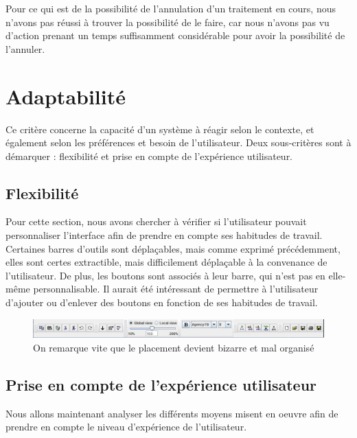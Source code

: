 \documentclass[12pt, a4paper]{article}
\begin{document}
Pour ce qui est de la possibilité de l'annulation d'un traitement en cours, nous n'avons pas réussi à trouver la possibilité de le faire, car nous n'avons pas vu d'action prenant un temps suffisamment considérable pour avoir la possibilité de l'annuler.

\section{Adaptabilité}
Ce critère concerne la capacité d'un système à réagir selon le contexte, et également selon les préférences et besoin de l'utilisateur. Deux sous-critères sont à démarquer : flexibilité et prise en compte de l'expérience utilisateur. 

\subsection{Flexibilité}
Pour cette section, nous avons chercher à vérifier si l'utilisateur pouvait personnaliser l'interface afin de prendre en compte ses habitudes de travail. \\


Certaines barres d'outils sont déplaçables, mais comme exprimé précédemment, elles sont certes extractible, mais difficilement déplaçable à la convenance de l'utilisateur. De plus, les boutons sont associés à leur barre, qui n'est pas en elle-même personnalisable. Il aurait été intéressant de permettre à l'utilisateur d'ajouter ou d'enlever des boutons en fonction de ses habitudes de travail.
\begin{figure}[h]
\begin{center}
   \includegraphics[scale = 0.5]{bazzare.jpg}
	\caption{On remarque vite que le placement devient bizarre et mal organisé}
	\end{center}
\end{figure}
\newpage
\subsection{Prise en compte de l'expérience utilisateur}
Nous allons maintenant analyser les différents moyens misent en oeuvre afin de prendre en compte le niveau d'expérience de l'utilisateur.\\
\end{document}
